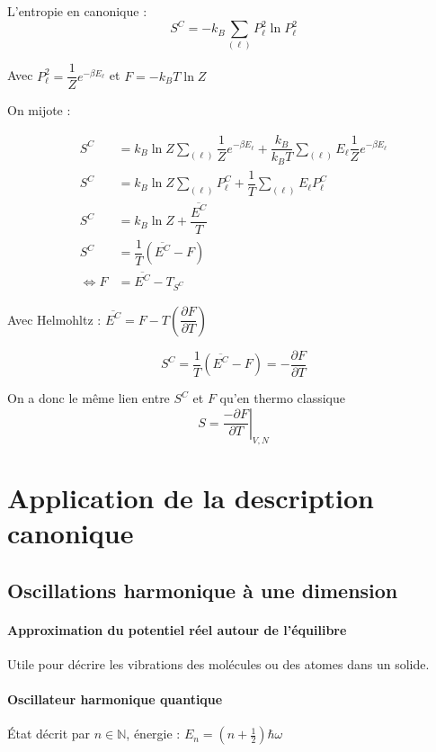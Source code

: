 \documentclass[12pt,a4paper]{report}
\begin{document}
L'entropie en canonique :
\[
	S^C = -k_B \sum_{(\ell)} P_\ell^2 \ln P_\ell^2
\]

Avec \(P_\ell^2 = \dfrac{1}{Z} e^{-\beta E_\ell}\) et \(F = -k_B T \ln Z\)

On mijote :

\begin{align*}
	S^C &= k_B \ln Z \sum_{(\ell)} \dfrac{1}{Z} e^{-\beta E_\ell} + \dfrac{k_B}{k_B T} \sum_{(\ell)} E_\ell \dfrac{1}{Z} e^{-\beta E_\ell}\\
	S^C &= k_B \ln Z \sum_{(\ell)} P_\ell^C + \dfrac{1}{T} \sum_{(\ell)} E_\ell P_\ell^C\\
	S^C &= k_B \ln Z + \dfrac{\overline{E^C}}{T}\\
	S^C &= \dfrac{1}{T} \left( \overline{E^C} - F \right)\\
	\Leftrightarrow F &= \overline{E^C} - T_{S^C}
\end{align*}

Avec Helmohltz : \(\overline{E^C} = F - T\left( \dfrac{\partial F}{\partial T} \right)\)

\[
	S^C = \dfrac{1}{T} \left( \overline{E^C} - F \right) = - \dfrac{\partial F}{\partial T}
\]

On a donc le même lien entre \(S^C\) et \(F\) qu'en thermo classique
\[
	S = \left. \dfrac{-\partial F}{\partial T}\right|_{V, N}
\]

\chapter{Application de la description canonique}

\section{Oscillations harmonique à une dimension}

\subsubsection{Approximation du potentiel réel autour de l'équilibre}

Utile pour décrire les vibrations des molécules ou des atomes dans un solide.

\subsubsection{Oscillateur harmonique quantique}

État décrit par \(n \in \mathbb{N}\), énergie : \(E_n = (n + \frac{1}{2}) \hbar \omega\)
\end{document}
